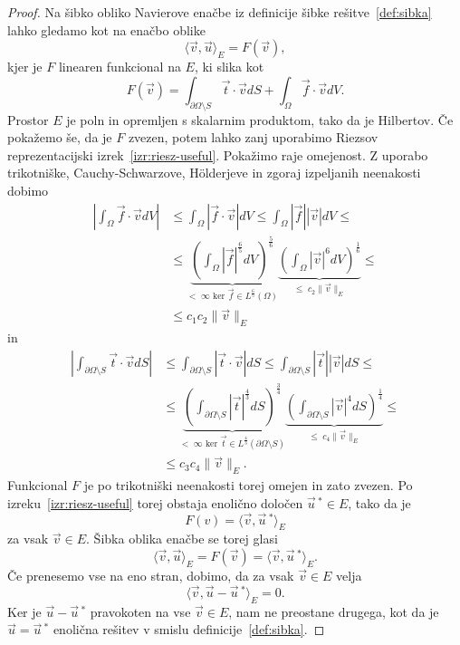 \documentclass[12pt,a4paper,twoside]{article}
\theoremstyle{definition} %
\theoremstyle{plain} %
\numberwithin{equation}{section}
\newcommand{\vv}{\vec{v}}
\newcommand{\vt}{\vec{t}}
\newcommand{\vu}{\vec{u}}
\newcommand{\vf}{\vec{f}}
\begin{document}
\begin{proof}
Na šibko obliko Navierove enačbe iz definicije šibke rešitve~\ref{def:sibka}
lahko gledamo kot na enačbo oblike
\begin{equation*}
  \langle \vv, \vu \rangle_E = F(\vv),
\end{equation*}
kjer je $F$ linearen funkcional na $E$, ki slika kot
\begin{equation*}
  F(\vv) = \int_{\partial \Omega\setminus S} \vt\cdot \vv dS + \int_{\Omega} \vf\cdot \vv dV.
\end{equation*}
Prostor $E$ je poln in opremljen s skalarnim produktom, tako da je Hilbertov.
Če pokažemo še, da je $F$ zvezen, potem lahko zanj uporabimo Riezsov
reprezentacijski izrek~\ref{izr:riesz-useful}. Pokažimo raje omejenost. Z
uporabo trikotniške, Cauchy-Schwarzove, H\"olderjeve in zgoraj izpeljanih
neenakosti dobimo
\begin{align*}
  \left| \int_\Omega \vf \cdot \vv dV \right| &\leq
  \int_\Omega \left|\vf \cdot \vv \right| dV \leq
  \int_\Omega |\vf| |\vv| dV \leq \\
  &\leq \underbrace{\left(\int_\Omega |\vf|^\frac65 dV \right)^\frac56}_{<\;\infty
    \text{ ker }\vf \in L^\frac65(\Omega)} \underbrace{\left( \int_\Omega
    |\vv|^6dV\right)^\frac16}_{\leq \; c_2 \|\vv\|_E} \leq \\
    &\leq c_1 c_2 \|\vv\|_E
\end{align*}
in
\begin{align*}
  \left| \int_{\partial \Omega \setminus S} \vt \cdot \vv dS \right| &\leq
  \int_{\partial \Omega \setminus S} \left|\vt \cdot \vv \right| dS \leq
  \int_{\partial \Omega \setminus S} |\vt| |\vv| dS \leq \\
  &\leq \underbrace{\left(\int_{\partial \Omega \setminus S} |\vt|^\frac43 dS \right)^\frac34}_{<\;\infty
    \text{ ker }\vt \in L^\frac43({\partial \Omega \setminus S})} \underbrace{\left( \int_{\partial \Omega \setminus S}
    |\vv|^4dS\right)^\frac14}_{\leq \; c_4 \|\vv\|_E} \leq \\
    &\leq c_3 c_4 \|\vv\|_E.
\end{align*}
Funkcional $F$ je po trikotniški neenakosti torej omejen in zato zvezen. Po
izreku~\ref{izr:riesz-useful} torej obstaja enolično določen $\vu\,^\ast \in E$,
tako da je
\begin{equation*}
   F(v) = \langle \vv, \vu\,^\ast \rangle_E
\end{equation*}
za vsak $\vv \in E$. Šibka oblika enačbe se torej glasi
\begin{equation*}
   \langle \vv, \vu \rangle_E = F(\vv) = \langle \vv, \vu\,^\ast \rangle_E.
\end{equation*}
Če prenesemo vse na eno stran, dobimo, da za vsak $\vv \in E$ velja
\begin{equation*}
   \langle \vv, \vu - \vu\,^\ast \rangle_E = 0.
\end{equation*}
Ker je $\vu-\vu\,^\ast$ pravokoten na vse $\vv \in E$, nam ne preostane drugega,
kot da je $\vu = \vu\,^\ast$ enolična rešitev v smislu definicije~\ref{def:sibka}.
\end{proof}
\end{document}
